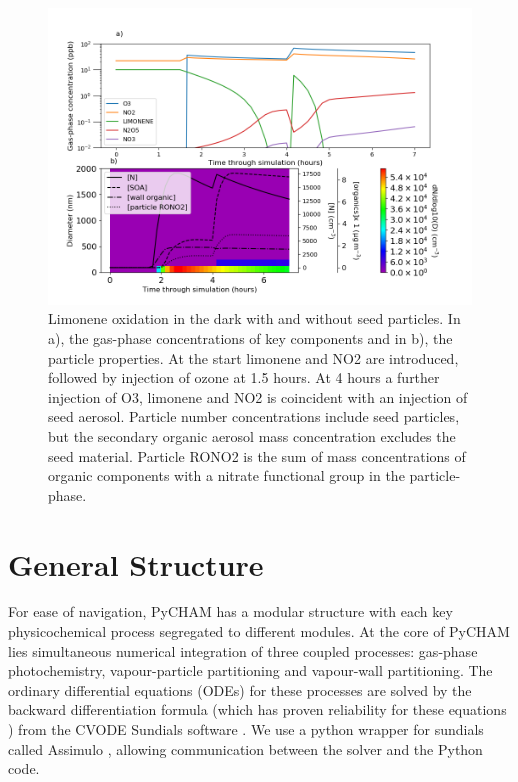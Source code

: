 \documentclass[gmd, manuscript]{copernicus}
\begin{document}
\begin{figure}[t]
\includegraphics[width=12.0cm]{Results/limonene_res_plot.png}
\caption{Limonene oxidation in the dark with and without seed particles.  In a), the gas-phase concentrations of key components and in b), the particle properties.  At the start limonene and NO2 are introduced, followed by injection of ozone at 1.5 hours.  At 4 hours a further injection of O3, limonene and NO2 is coincident with an injection of seed aerosol.  Particle number concentrations include seed particles, but the secondary organic aerosol mass concentration excludes the seed material.  Particle RONO2 is the sum of mass concentrations of organic components with a nitrate functional group in the particle-phase.}
\label{fig:limonene_output_plot}
\end{figure}

\section{General Structure}

For ease of navigation, PyCHAM has a modular structure with each key physicochemical process segregated to different modules.  At the core of PyCHAM lies simultaneous numerical integration of three coupled processes: gas-phase photochemistry, vapour-particle partitioning and vapour-wall partitioning.  The ordinary differential equations (ODEs) for these processes are solved by the backward differentiation formula (which has proven reliability for these equations \citep{Jacobson2005}) from the CVODE Sundials software \citep{hindmarsh2005sundials}.  We use a python wrapper for sundials called Assimulo \citep{Andersson2015}, allowing communication between the solver and the Python code.
\end{document}
